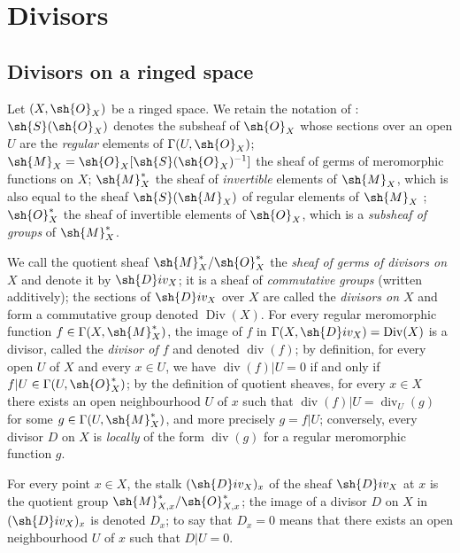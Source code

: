 \section{Divisors}
\label{section:IV.21}

\subsection{Divisors on a ringed space}
\label{subsection:IV.21.1}

\begin{env}[21.1.1]
\label{IV.21.1.1}
Let $(X,\sh{O}_X)$ be a ringed space.
We retain the notation of :
$\sh{S}(\sh{O}_X)$ denotes the subsheaf of $\sh{O}_X$ whose sections over an open $U$ are the \emph{regular} elements of $\Gamma(U,\sh{O}_X)$;
$\sh{M}_X=\sh{O}_X[\sh{S}(\sh{O}_X)^{-1}]$ the sheaf of germs of meromorphic functions on $X$;
$\sh{M}_X^*$ the sheaf of \emph{invertible} elements of $\sh{M}_X$, which is also equal to the sheaf $\sh{S}(\sh{M}_X)$ of regular elements of $\sh{M}_X$ ;
$\sh{O}_X^*$ the sheaf of invertible elements of $\sh{O}_X$, which is a \emph{subsheaf of groups} of $\sh{M}_X^*$.
\end{env}

\begin{env}[21.1.2]
\label{IV.21.1.2}
We call the quotient sheaf $\sh{M}_X^*/\sh{O}_X^*$ the \emph{sheaf of germs of divisors on $X$} and denote it by $\sh{D}iv_X$;
it is a sheaf of \emph{commutative groups} (written additively);
the sections of $\sh{D}iv_X$ over $X$ are called the \emph{divisors on $X$} and form a commutative group denoted $\operatorname{Div}(X)$.
For every regular meromorphic function $f\in\Gamma(X,\sh{M}_X^*)$, the image of $f$ in $\Gamma(X,\sh{D}iv_X)=\operatorname{Div}(X)$ is a divisor, called the \emph{divisor of $f$} and denoted $\operatorname{div}(f)$;
by definition, for every open $U$ of $X$ and every $x\in U$, we have $\operatorname{div}(f)|U=0$ if and only if $f|U\in\Gamma(U,\sh{O}_X^*)$;
by the definition of quotient sheaves, for every $x\in X$ there exists an open neighbourhood $U$ of $x$ such that $\operatorname{div}(f)|U=\operatorname{div}_U(g)$ for some $g\in\Gamma(U,\sh{M}_X^*)$, and more precisely $g=f|U$;
conversely, every divisor $D$ on $X$ is \emph{locally} of the form $\operatorname{div}(g)$ for a regular meromorphic function $g$.
\end{env}

\begin{env}[21.1.2.1]
\label{IV.21.1.2.1}
For every point $x\in X$, the stalk $(\sh{D}iv_X)_x$ of the sheaf $\sh{D}iv_X$ at $x$ is the quotient group $\sh{M}_{X,x}^*/\sh{O}_{X,x}^*$;
the image of a divisor $D$ on $X$ in $(\sh{D}iv_X)_x$ is denoted $D_x$;
to say that $D_x=0$ means that there exists an open neighbourhood $U$ of $x$ such that $D|U=0$.
\end{env}


